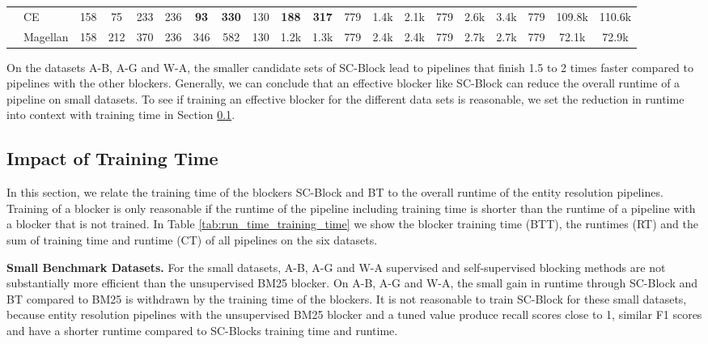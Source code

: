 \documentclass[sigconf,nonacm]{acmart}
\begin{document}
\begin{table*}[]
\begin{tabular}{@{}ll|ccc|ccc|ccc|ccc|ccc|ccc@{}}
 & CE       & 158                   & 75          & 233         & 236                   & \textbf{93} & \textbf{330} & 130                   & \textbf{188} & \textbf{317} & 779                   & 1.4k         & 2.1k         & 779                   & 2.6k         & 3.4k         & 779 & 109.8k         & 110.6k         \\
 & Magellan & 158                   & 212         & 370         & 236                   & 346         & 582          & 130                   & 1.2k         & 1.3k         & 779                   & 2.4k         & 2.4k         & 779                   & 2.7k         & 2.7k         & 779 & 72.1k          & 72.9k    
   \\ 
\bottomrule
\end{tabular}
\end{table*}


On the datasets A-B, A-G and W-A, the smaller candidate sets of SC-Block lead to pipelines that finish 1.5 to 2 times faster compared to pipelines with the other blockers.
Generally, we can conclude that an effective blocker like SC-Block can reduce the overall runtime of a pipeline on small datasets.
To see if training an effective blocker for the different data sets is reasonable, we set the reduction in runtime into context with training time in Section \ref{sub-sec:impact_of_training_time}.


\subsection{Impact of Training Time}
\label{sub-sec:impact_of_training_time}

In this section, we relate the training time of the blockers SC-Block and BT to the overall runtime of the entity resolution pipelines.
Training of a blocker is only reasonable if the runtime of the pipeline including training time is shorter than the runtime of a pipeline with a blocker that is not trained.
In Table \ref{tab:run_time_training_time} we show the blocker training time (BTT), the runtimes (RT) and the sum of training time and runtime (CT) of all pipelines on the six datasets.


\vspace{.1cm}\noindent\textbf{Small Benchmark Datasets.}
For the small datasets, A-B, A-G and W-A supervised and self-supervised blocking methods are not substantially more efficient than the unsupervised BM25 blocker. On A-B, A-G and W-A, the small gain in runtime through SC-Block and BT compared to BM25 is withdrawn by the training time of the blockers.
It is not reasonable to train SC-Block for these small datasets, because entity resolution pipelines with the unsupervised BM25 blocker and a tuned  value produce recall scores close to 1, similar F1 scores and have a shorter runtime compared to SC-Blocks training time and runtime. 
\end{document}
